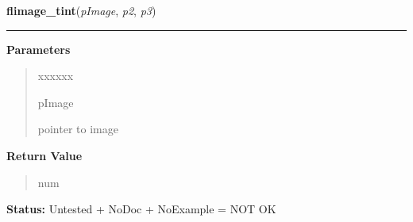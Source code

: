 \hspace{.8\funcindent}\begin{boxedminipage}{\funcwidth}

    \raggedright \textbf{flimage\_tint}(\textit{pImage}, \textit{p2}, \textit{p3})

    \vspace{-1.5ex}

    \rule{\textwidth}{0.5\fboxrule}
\setlength{\parskip}{2ex}
\setlength{\parskip}{1ex}
      \textbf{Parameters}
      \vspace{-1ex}

      \begin{quote}
        \begin{Ventry}{xxxxxx}

          \item[pImage]

          pointer to image

        \end{Ventry}

      \end{quote}

      \textbf{Return Value}
    \vspace{-1ex}

      \begin{quote}
      num

      \end{quote}

\textbf{Status:} Untested + NoDoc + NoExample = NOT OK



    \end{boxedminipage}

    \label{xformslib:library:flimage_rotate}

    \vspace{0.5ex}

